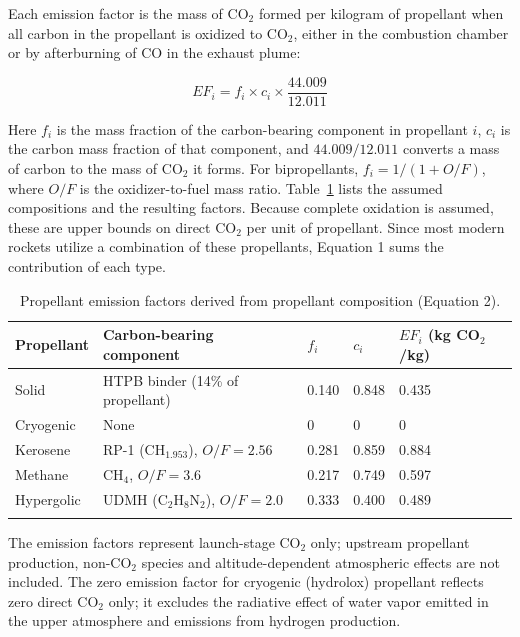 \documentclass[pdflatex,sn-mathphys-num]{sn-jnl}
\theoremstyle{thmstyleone}%
\theoremstyle{thmstyletwo}%
\theoremstyle{thmstylethree}%
\begin{document}
Each emission factor is the mass of CO$_2$ formed per kilogram of propellant when all carbon in the propellant is oxidized to CO$_2$, either in the combustion chamber or by afterburning of CO in the exhaust plume:

\begin{equation}
EF_{i} = f_{i} \times c_{i} \times \frac{44.009}{12.011}
\end{equation}

Here \( f_{i} \) is the mass fraction of the carbon-bearing component in propellant \( i \), \( c_{i} \) is the carbon mass fraction of that component, and \( 44.009/12.011 \) converts a mass of carbon to the mass of CO$_2$ it forms. For bipropellants, \( f_{i} = 1/(1 + O/F) \), where \( O/F \) is the oxidizer-to-fuel mass ratio. Table~\ref{tab:propellant_factors} lists the assumed compositions and the resulting factors. Because complete oxidation is assumed, these are upper bounds on direct CO$_2$ per unit of propellant. Since most modern rockets utilize a combination of these propellants, Equation 1 sums the contribution of each type.

\begin{table}[h]
\caption{Propellant emission factors derived from propellant composition (Equation 2).}
\label{tab:propellant_factors}
\begin{tabular}{@{}lllll@{}}
\toprule
Propellant & Carbon-bearing component & \( f_{i} \) & \( c_{i} \) & \( EF_{i} \) (kg CO$_2$/kg) \\
\midrule
Solid & HTPB binder (14\% of propellant) & 0.140 & 0.848 & 0.435 \\
Cryogenic & None & 0 & 0 & 0 \\
Kerosene & RP-1 (CH\(_{1.953}\)), \( O/F = 2.56 \) & 0.281 & 0.859 & 0.884 \\
Methane & CH\(_4\), \( O/F = 3.6 \) & 0.217 & 0.749 & 0.597 \\
Hypergolic & UDMH (C\(_2\)H\(_8\)N\(_2\)), \( O/F = 2.0 \) & 0.333 & 0.400 & 0.489 \\
\botrule
\end{tabular}
\end{table}

The emission factors represent launch-stage CO$_2$ only; upstream propellant production, non-CO$_2$ species and altitude-dependent atmospheric effects are not included. The zero emission factor for cryogenic (hydrolox) propellant reflects zero direct CO$_2$ only; it excludes the radiative effect of water vapor emitted in the upper atmosphere and emissions from hydrogen production.
\end{document}
